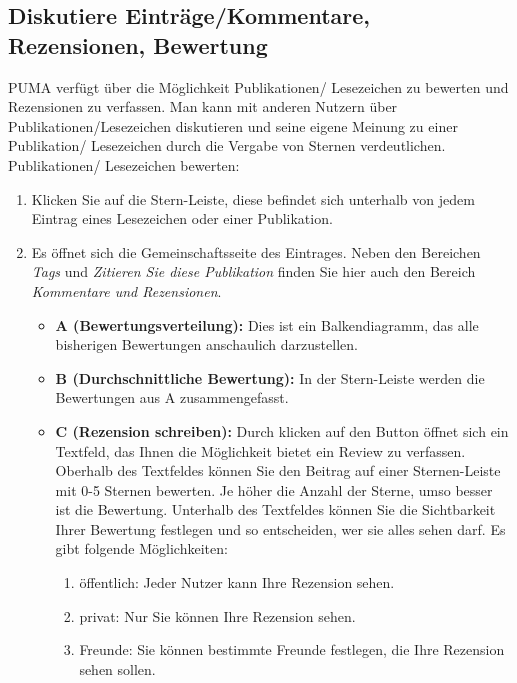\documentclass[a4paper,11pt,twoside]{scrbook}
\begin{document}

\subsection{Diskutiere Einträge/Kommentare, Rezensionen, Bewertung}
PUMA verfügt über die Möglichkeit Publikationen/ Lesezeichen zu bewerten und Rezensionen zu verfassen. Man kann mit anderen Nutzern über Publikationen/Lesezeichen diskutieren und seine eigene Meinung zu einer Publikation/ Lesezeichen durch die Vergabe von Sternen verdeutlichen.
\newline
\newline
Publikationen/ Lesezeichen bewerten:
\begin{enumerate}
    \item Klicken Sie auf die Stern-Leiste, diese befindet sich unterhalb von jedem Eintrag eines Lesezeichen oder einer Publikation.  
    \item Es öffnet sich die Gemeinschaftsseite des Eintrages. Neben den Bereichen \textit{Tags} und \textit{Zitieren Sie diese Publikation} finden Sie hier auch den Bereich \textit{Kommentare und Rezensionen}. 
    \begin{itemize} %
        \item \textbf{A (Bewertungsverteilung):} Dies ist ein Balkendiagramm, das alle bisherigen Bewertungen anschaulich darzustellen. %
        \item \textbf{B (Durchschnittliche Bewertung):} In der Stern-Leiste  werden die Bewertungen aus A zusammengefasst.
        \item \textbf{C (Rezension schreiben):} Durch klicken auf den Button öffnet sich ein Textfeld, das Ihnen die Möglichkeit bietet ein Review  zu verfassen. Oberhalb des Textfeldes können Sie den Beitrag auf einer Sternen-Leiste mit 0-5 Sternen bewerten. Je höher die Anzahl der Sterne, umso besser ist die Bewertung. Unterhalb des Textfeldes können Sie die Sichtbarkeit Ihrer Bewertung festlegen und so entscheiden, wer sie alles sehen darf. Es gibt folgende Möglichkeiten:
        \begin{enumerate}
            \item öffentlich: Jeder Nutzer kann Ihre Rezension sehen.
            \item privat: Nur Sie können Ihre Rezension sehen.
            \item Freunde: Sie können bestimmte Freunde festlegen, die Ihre Rezension sehen sollen.

\end{enumerate}
\end{itemize}
\end{enumerate}
\end{document}
